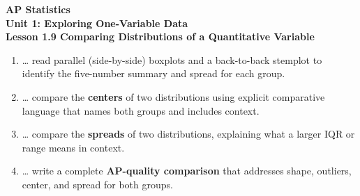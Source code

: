 \documentclass[10pt]{article}
\begin{document}
\vspace{-0.8in}

\begin{center}
  {\color{white}\textbf{\LARGE AP Statistics}}\\[4pt]
  {\color{skymid}\large\textbf{Unit 1: Exploring One-Variable Data}}\\[6pt]
  {\color{white}\textbf{\large Lesson 1.9 \quad Comparing Distributions of a Quantitative Variable}}
\end{center}

\vspace{0.22in}

\namedateperiod

\vspace{0.18in}

\begin{learningtargetbox}
\small
\begin{enumerate}[leftmargin=1.5em, itemsep=5pt]
  \item \ldots{} read parallel (side-by-side) boxplots and a back-to-back stemplot
        to identify the five-number summary and spread for each group.
  \item \ldots{} compare the \textbf{centers} of two distributions using explicit
        comparative language that names both groups and includes context.
  \item \ldots{} compare the \textbf{spreads} of two distributions, explaining what
        a larger IQR or range means in context.
  \item \ldots{} write a complete \textbf{AP-quality comparison} that addresses
        shape, outliers, center, and spread for both groups.
\end{enumerate}
\end{learningtargetbox}

\vspace{0.14in}
\end{document}
